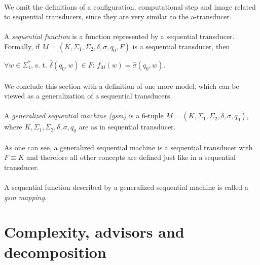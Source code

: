 \paragraph{}
We omit the definitions of a configuration, computational step and image related to sequential transducers, since they are very similar to the a-transducer.

\paragraph{}
 A \emph{sequential function} is a function represented by a sequential transducer. Formally, if $M=(K, \Sigma_{1}, \Sigma_{2}, \delta, \sigma, q_{0}, F)$ is a sequential transducer, then \\
\centerline{$\forall w \in \Sigma_{1}^{*}$, s. t. $\hat{\delta}(q_{0}, w) \in F$: $f_{M}(w) = \hat{\sigma}(q_{0}, w)$.}

\paragraph{}
We conclude this section with a definition of one more model, which can be viewed as a generalization of a sequential transducers.

\paragraph{}
 A \emph{generalized sequential machine (gsm)} is a 6-tuple $M=(K, \Sigma_{1}, \Sigma_{2}, \delta, \sigma, q_{0})$, where $K, \Sigma_{1}, \Sigma_{2}, \delta, \sigma, q_{0}$ are as in sequential transducer.

\paragraph{}
As one can see, a generalized sequential machine is a sequential transducer with $F \equiv K$ and therefore all other concepts are defined just like in a sequential transducer.

\paragraph{}
\oznacenie A sequential function described by a generalized sequential machine is called a \emph{gsm mapping}.

\section{Complexity, advisors and decomposition}

